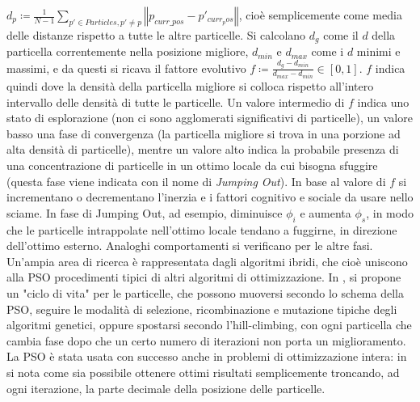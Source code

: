 \documentclass[12pt]{article}
\begin{document}
\newline
$d_{p} \coloneqq \frac{\displaystyle 1}{\displaystyle N-1} \sum_{p' \in Particles, p' \neq p} \left\Vert p_{curr\_pos} - p'_{curr_pos} \right\Vert $,
cioè semplicemente come media delle distanze rispetto a tutte le altre particelle. \newline
Si calcolano $d_g$ come il $d$ della particella correntemente nella posizione migliore, $d_{min}$ e $d_{max}$ come i $d$ minimi e massimi, e da questi si ricava il fattore evolutivo\newline
\newline
 $f \coloneqq \frac{\displaystyle d_g - d_{min}}{\displaystyle d_{max}-d_{min}} \in \left[ 0, 1 \right]$. \newline
\newline
$f$ indica quindi dove la densità della particella migliore si colloca rispetto all'intero intervallo delle densità di tutte le particelle. Un valore intermedio di $f$ indica uno stato di esplorazione (non ci sono agglomerati significativi di particelle), un valore basso una fase di convergenza (la particella migliore si trova in una porzione ad alta densità di particelle), mentre un valore alto indica la probabile presenza di una concentrazione di particelle in un ottimo locale da cui bisogna sfuggire (questa fase viene indicata con il nome di \textit{Jumping Out}). In base al valore di $f$ si incrementano o decrementano l'inerzia e i fattori cognitivo e sociale da usare nello sciame. In fase di Jumping Out, ad esempio, diminuisce $\phi_i$ e aumenta $\phi_s$, in modo che le particelle intrappolate nell'ottimo locale tendano a fuggirne, in direzione dell'ottimo esterno. Analoghi comportamenti si verificano per le altre fasi. 
\newline
Un'ampia area di ricerca è rappresentata dagli algoritmi ibridi, che cioè uniscono alla PSO procedimenti tipici di altri algoritmi di ottimizzazione. In \cite{KrinkAl2002}, si propone un "ciclo di vita" per le particelle, che possono muoversi secondo lo schema della PSO, seguire le modalità di selezione, ricombinazione e mutazione tipiche degli algoritmi genetici, oppure spostarsi secondo l'hill-climbing, con ogni particella che cambia fase dopo che un certo numero di iterazioni non porta un miglioramento.
\newline
La PSO è stata usata con successo anche in problemi di ottimizzazione intera: in \cite{LaskariAl2002} si nota come sia possibile ottenere ottimi risultati semplicemente troncando, ad ogni iterazione, la parte decimale della posizione delle particelle.\newline
\end{document}
